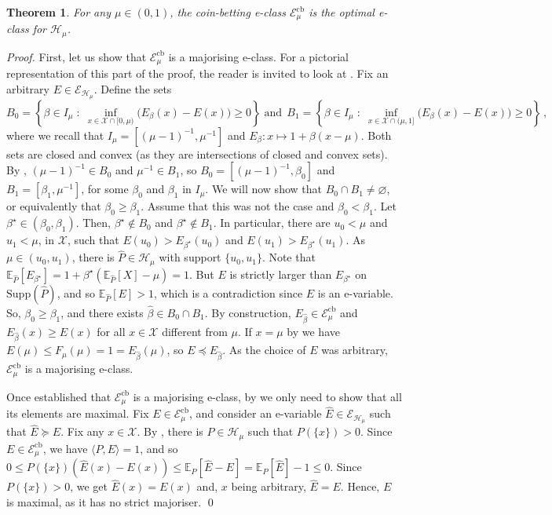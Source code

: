 \documentclass[3p, authoryear, 10pt]{elsarticle}%
\newcommand{\E}{\mathbb E}
\newcommand{\Ecb}{\mathcal E^{\mathrm{cb}}}
\newcommand{\Ee}{\mathcal E}
\newcommand{\Hh}{\mathcal H}
\newcommand{\supp}{\mathrm{Supp}}
\newcommand{\X}{\mathcal X}
\newtheorem{theorem}{Theorem}
\begin{document}
\begin{theorem}\label{thm:main}
    For any $\mu\in(0,1)$, the coin-betting e-class $\Ecb_\mu$ is the optimal e-class for $\Hh_\mu$.
\end{theorem}
\begin{proof}
    First, let us show that $\Ecb_\mu$ is a majorising e-class. For a pictorial representation of this part of the proof, the reader is invited to look at . Fix an arbitrary $E\in\Ee_{\Hh_\mu}$. Define the sets
    $$B_0 = \left\{\beta\in I_\mu\;:\; \inf_{x\in\X\cap[0,\mu)}\big(E_\beta(x)-E(x)\big)\geq0\right\}\;\text{and}\,\; B_1 = \left\{\beta\in I_\mu\;:\; \inf_{x\in\X\cap(\mu,1]}\big(E_\beta(x)-E(x)\big)\geq0\right\}\,,$$ where we recall that $I_\mu = [(\mu-1)^{-1}, \mu^{-1}]$ and $E_\beta:x\mapsto 1+\beta(x-\mu)$. Both sets are closed and convex (as they are intersections of closed and convex sets). By , $(\mu-1)^{-1}\in B_0$ and $\mu^{-1}\in B_1$, so $B_0 = [(\mu-1)^{-1},\beta_0]$ and $B_1 = [\beta_1, \mu^{-1}]$, for some $\beta_0$ and $\beta_1$ in $I_\mu$. We will now show that $B_0\cap B_1\neq\varnothing$, or equivalently that $\beta_0\geq\beta_1$. Assume that this was not the case and $\beta_0<\beta_1$. Let $\beta^\star\in(\beta_0, \beta_1)$. Then, $\beta^\star\notin B_0$ and $\beta^\star\notin B_1$. In particular, there are $u_0<\mu$ and $u_1<\mu$, in $\X$, such that $E(u_0)>E_{\beta^\star}(u_0)$ and $E(u_1)>E_{\beta^\star}(u_1)$.  As $\mu\in(u_0, u_1)$, there is $\hat P\in\Hh_\mu$ with support $\{u_0,u_1\}$. Note that $\E_{\hat P}[E_{\beta^\star}] = 1 + \beta^\star(\E_{\hat P}[X] -\mu) = 1$. But $E$ is strictly larger than $E_{\beta^\star}$ on $\supp(\hat P)$, and so $\E_{\hat P}[E] >1$, which is a contradiction since $E$ is an e-variable. So, $\beta_0\geq\beta_1$, and there exists $\hat\beta\in B_0\cap B_1$. By construction, $E_{\hat\beta}\in\Ecb_\mu$ and $E_{\hat\beta}(x)\geq E(x)$ for all $x\in\X$ different from $\mu$. If  $x=\mu$ by  we have $E(\mu)\leq F_\mu(\mu) = 1 = E_{\hat\beta}(\mu)$, so $E\preceq E_{\hat\beta}$. As the choice of $E$ was arbitrary, $\Ecb_\mu$ is a majorising e-class. 
    
    Once established that $\Ecb_\mu$ is a majorising e-class, by  we only need to show that all its elements are maximal. Fix $E\in\Ecb_\mu$, and consider an e-variable $\hat E\in\Ee_{\Hh_\mu}$ such that $\hat E\succeq E$. Fix any $x\in\X$. By , there is $P\in\Hh_\mu$ such that $P(\{x\})>0$. Since $E\in\Ecb_\mu$, we have $\langle P, E\rangle =1$, and so $0\leq P(\{x\})(\hat E(x)-E(x))\leq\E_P[\hat E -E] =\E_P[\hat E] -1\leq 0$. Since $P(\{x\})>0$, we get $\hat E(x)=E(x)$ and, $x$ being arbitrary,  $\hat E=E$. Hence, $E$ is maximal, as it has no strict majoriser. \qed
\end{proof}
\end{document}
